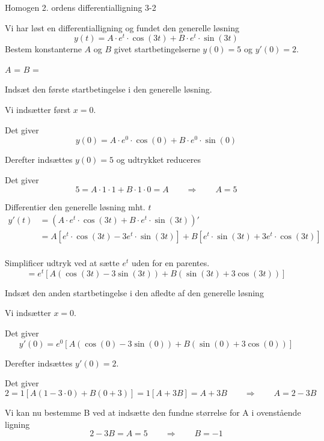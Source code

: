 \documentclass{article}
\begin{document}
\newpage

\begin{exercise}{Homogen 2. ordens differentialligning 3-2}
	
	Vi har løst en differentialligning og fundet den generelle løsning
	\[
	y(t) = A \cdot e^{t}  \cdot \cos(3 t)+ B \cdot e^{t}  \cdot \sin(3 t)
	\]
	Bestem konstanterne $A$ og $B$ givet startbetingelserne $y(0)=5$ og $y'(0)=2$.
	
	
	$A$ = 		
$B$ = 
	
	\hint
	
	Indsæt den første startbetingelse i den generelle løsning. 
	
	
	\hint
	
	Vi indsætter først $x=0$.
	
	\hint
	
	Det giver
	\[
	y(0)=  A \cdot e^{0}  \cdot \cos(0)+ B \cdot e^{0}  \cdot \sin(0)
	\]
	
	\hint
	
	Derefter indsættes $y(0)=5$ og udtrykket reduceres
	
	\hint 
	
	Det giver 
	\[
	5= A \cdot 1  \cdot 1+ B \cdot 1  \cdot 0  = A \qquad \Rightarrow \qquad A = 5
	\]
	
	\hint 
	
	Differentier den generelle løsning mht. $t$
	\begin{align*}
	y'(t) &= \left(A \cdot e^{ t}  \cdot \cos(3 t)+ B \cdot e^{t}  \cdot \sin(3t)\right)' \\
			&= A \left[e^{t} \cdot \cos(3t) - 3e^{t} \cdot \sin(3t) \right] + B \left[e^{t} \cdot \sin(3t) + 3e^{t} \cdot \cos(3t) \right] \\
	\end{align*}
	
	\hint
	
	Simplificer udtryk ved at sætte $e^{t}$ uden for en parentes.
	\[
	= e^{t} \left[ A (\cos(3t)-3\sin(3t)) + B (\sin(3t) + 3\cos(3t))   \right]
	\]
	
	\hint 
	
	Indsæt den anden startbetingelse i den afledte af den generelle løsning
	
	\hint
	
	Vi indsætter $x=0$.
	
	\hint 
	
	Det giver
	\[
	y'(0) = e^{0} \left[ A (\cos(0)-3 \sin(0)) + B (\sin(0) + 3 \cos(0))   \right]
	\]
	
	\hint 
	
	Derefter indsættes $y'(0)=2$.	
	\hint
	
	Det giver
	\[
	2 = 1 \left[ A (1- 3 \cdot 0) + B (0 + 3 )   \right] = 1 \left[ A +  3B    \right] = A + 3B \qquad \Rightarrow \qquad A = 2 - 3B
	\]
	
	\hint 
	
	Vi kan nu bestemme B ved at indsætte den fundne størrelse for A i ovenstående ligning
	\[
	2 - 3B = A = 5 \qquad \Rightarrow \qquad B = -1
	\]
	
	
\end{exercise}
\end{document}
